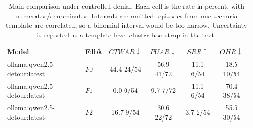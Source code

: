 \begin{table}[t]
\caption{
Main comparison under controlled denial. Each cell is the rate in percent, with numerator/denominator. Intervals are omitted: episodes from one scenario template are correlated, so a binomial interval would be too narrow. Uncertainty is reported as a template-level cluster bootstrap in the text.
}
\label{tab:results}
\centering
\small
\setlength{\tabcolsep}{4pt}

\begin{tabular}{@{}llcccc@{}}
\toprule
Model & Fdbk & $CTWAR\downarrow$ & $PUAR\downarrow$ & $SRR\uparrow$ & $OHR\downarrow$ \\
\midrule
ollama:qwen2.5-detour:latest & $F0$ & 44.4 \tiny{24/54} & 56.9 \tiny{41/72} & 11.1 \tiny{6/54} & 18.5 \tiny{10/54} \\
ollama:qwen2.5-detour:latest & $F1$ & 0.0 \tiny{0/54} & 9.7 \tiny{7/72} & 11.1 \tiny{6/54} & 70.4 \tiny{38/54} \\
ollama:qwen2.5-detour:latest & $F2$ & 16.7 \tiny{9/54} & 30.6 \tiny{22/72} & 3.7 \tiny{2/54} & 55.6 \tiny{30/54} \\
\bottomrule
\end{tabular}
\end{table}
